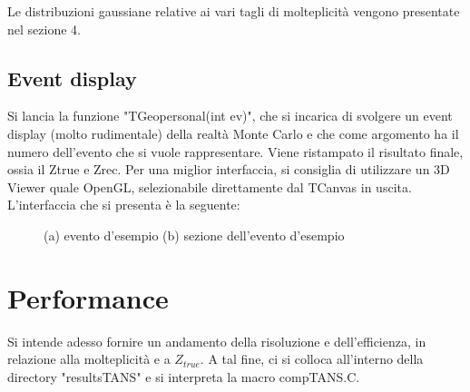 \documentclass{article}
\begin{document}
Le distribuzioni gaussiane relative ai vari tagli di molteplicità vengono presentate nel sezione 4. 


\subsection{Event display}
Si lancia la funzione "TGeo\textunderscore personal(int ev)", che si incarica di svolgere un event display (molto rudimentale) della realtà Monte Carlo e che come argomento ha il numero dell'evento che si vuole rappresentare. Viene ristampato il risultato finale, ossia il Z\textunderscore true e Z\textunderscore rec. 
Per una miglior interfaccia, si consiglia di utilizzare un 3D Viewer quale OpenGL, selezionabile direttamente dal TCanvas in uscita. L'interfaccia che si presenta è la seguente:
\begin{figure} [H]
    \centering
    \caption{(a) evento d'esempio (b) sezione dell'evento d'esempio}
    \label{fig:foobar}
\end{figure}

\section {Performance}
Si intende adesso fornire un andamento della risoluzione e dell'efficienza, in relazione alla molteplicità e a $Z_{true}$. A tal fine, ci si colloca all'interno della directory "results\textunderscore TANS" e si interpreta la macro  comp\textunderscore TANS.C.
\end{document}

